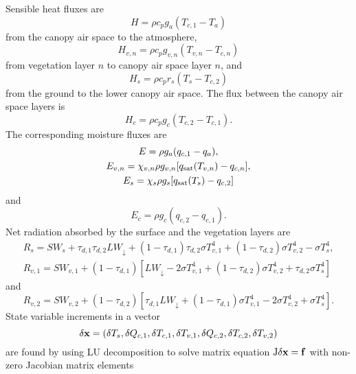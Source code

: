 \documentclass[fleqn]{article}
\begin{document}
Sensible heat fluxes are
\begin{equation}
H = \rho c_p g_a(T_{c,1} - T_a)
\end{equation}
from the canopy air space to the atmosphere,
\begin{equation}
H_{v,n} = \rho c_p g_{v,n}(T_{v,n} - T_{c,n})
\end{equation}
from vegetation layer $n$ to canopy air space layer $n$, and
\begin{equation}
H_s = \rho c_p r_s(T_s - T_{c,2})
\end{equation}
from the ground to the lower canopy air space. The flux between the canopy air space layers is
\begin{equation}
H_c = \rho c_p g_c(T_{c,2} - T_{c,1}).
\end{equation}
The corresponding moisture fluxes are
\begin{gather}
E = \rho g_a(q_{c,1} - q_a), \\
E_{v,n} = \chi_{v,n}\rho g_{v,n}[q_{\rm sat}(T_{v,n}) - q_{c,n}], \\
E_s = \chi_s\rho g_s[q_{\rm sat}(T_s) - q_{c,2}]
\end{gather}
and
\begin{equation}
E_c = \rho g_c(q_{c,2} - q_{c,1}).
\end{equation}
Net radiation absorbed by the surface and the vegetation layers are
\begin{gather}
R_s = SW_s + \tau_{d,1}\tau_{d,2}LW_\downarrow + (1-\tau_{d,1})\tau_{d,2}\sigma T_{v,1}^4 + (1-\tau_{d,2})\sigma T_{v,2}^4 
           - \sigma T_s^4, \\
R_{v,1} = SW_{v,1} + (1 - \tau_{d,1})[LW_\downarrow - 2\sigma T_{v,1}^4 + (1-\tau_{d,2})\sigma T_{v,2}^4 + \tau_{d,2}\sigma T_s^4]
\end{gather}
and
\begin{equation}
R_{v,2} = SW_{v,2} + (1 - \tau_{d,2})[\tau_{d,1}LW_\downarrow + (1 - \tau_{d,1})\sigma T_{v,1}^4 - 2\sigma T_{v,2}^4 + \sigma T_s^4].
\end{equation}
State variable increments in a vector
\begin{equation}
{\bf \delta x} = (\delta T_s, \delta Q_{c,1}, \delta T_{c,1}, \delta T_{v,1}, \delta Q_{c,2}, \delta T_{c,2}, \delta T_{v,2})
\end{equation} 
are found by using LU decomposition to solve matrix equation ${\rm J}{\bf \delta x} = {\bf f}$ with non-zero Jacobian matrix elements  
\end{document}
